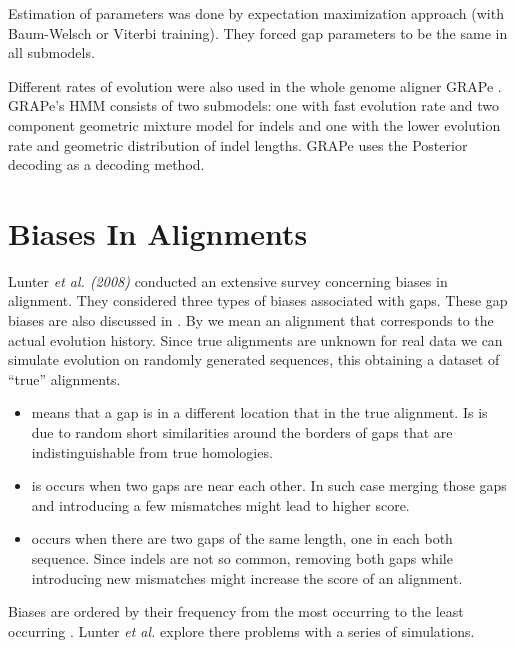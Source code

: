 Estimation of parameters was done by expectation maximization approach (with
Baum-Welsch or Viterbi training). They forced gap parameters to be the same in all
submodels.

Different rates of evolution were also used  in the whole genome aligner GRAPe
\cite{Satija2010}. GRAPe's HMM  consists of two submodels: one with fast
evolution rate and two component geometric mixture model for indels and one with
the lower evolution rate and geometric distribution of indel lengths. GRAPe uses
the Posterior decoding as a decoding method.


\section{Biases In Alignments}
\label{SECTION:BIASES}
Lunter {\it et al. (2008)} conducted an extensive survey concerning biases in
alignment. They considered three types of biases associated with gaps. These gap
biases are also discussed in \cite{Durbin1998}. By 
we mean an alignment that corresponds to the actual evolution history.  Since
true alignments are unknown for real data we can simulate evolution on randomly
generated sequences, this obtaining a dataset of ``true'' alignments.

\begin{itemize}

\item {} means that a gap is in a different location that in
the true alignment. Is is due to random short similarities around the borders of
gaps that are indistinguishable from true homologies.

\item {} is occurs when two gaps are near each other.
In such case merging those gaps and introducing a few mismatches might lead to
higher score. 

\item {} occurs when there are two gaps of the same
length, one in each both sequence. Since indels are not so common, removing both
gaps while introducing new mismatches might increase the score of an alignment.

\end{itemize}


Biases are ordered by their frequency from the most occurring to the least
occurring \cite{Lunter2008}. Lunter {\it et al.} explore there problems with a
series of simulations.


